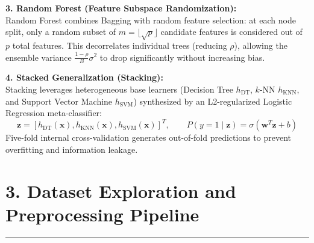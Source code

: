 \documentclass[11pt,a4paper]{article}
\begin{document}
\vspace{0.04cm}
\noindent\textbf{3. Random Forest (Feature Subspace Randomization):}\\
Random Forest combines Bagging with random feature selection: at each node split, only a random subset of $m = \lfloor\sqrt{p}\rfloor$ candidate features is considered out of $p$ total features. This decorrelates individual trees (reducing $\rho$), allowing the ensemble variance $\frac{1-\rho}{B}\sigma^2$ to drop significantly without increasing bias.

\vspace{0.04cm}
\noindent\textbf{4. Stacked Generalization (Stacking):}\\
Stacking leverages heterogeneous base learners (Decision Tree $h_{\text{DT}}$, $k$-NN $h_{\text{KNN}}$, and Support Vector Machine $h_{\text{SVM}}$) synthesized by an L2-regularized Logistic Regression meta-classifier:
{\setlength{\abovedisplayskip}{2pt}\setlength{\belowdisplayskip}{2pt}
\begin{equation}
    \mathbf{z} = \left[ h_{\text{DT}}(\mathbf{x}), h_{\text{KNN}}(\mathbf{x}), h_{\text{SVM}}(\mathbf{x}) \right]^T, \qquad P(y=1 \mid \mathbf{z}) = \sigma\left(\mathbf{w}^T \mathbf{z} + b\right)
\end{equation}}
Five-fold internal cross-validation generates out-of-fold predictions to prevent overfitting and information leakage.

\newpage

\section*{3. Dataset Exploration and Preprocessing Pipeline}
\noindent\rule{\textwidth}{0.5pt}\vspace{0.05cm}
\end{document}
